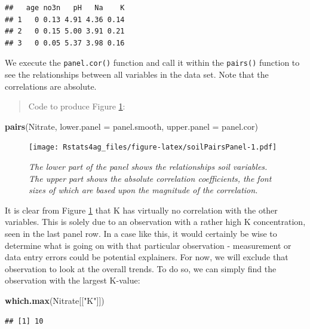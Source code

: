 \documentclass[letterpaper,]{book}
\newenvironment{Shaded}{\begin{snugshade}}{\end{snugshade}}
\newcommand{\DataTypeTok}[1]{\textcolor[rgb]{0.13,0.29,0.53}{#1}}
\newcommand{\KeywordTok}[1]{\textcolor[rgb]{0.13,0.29,0.53}{\textbf{#1}}}
\newcommand{\NormalTok}[1]{#1}
\newcommand{\StringTok}[1]{\textcolor[rgb]{0.31,0.60,0.02}{#1}}
\begin{document}
\begin{verbatim}
##   age no3n   pH   Na    K
## 1   0 0.13 4.91 4.36 0.14
## 2   0 0.15 5.00 3.91 0.21
## 3   0 0.05 5.37 3.98 0.16
\end{verbatim}

We execute the \texttt{panel.cor()} function and call it within the \texttt{pairs()} function to see the relationships between all variables in the data set. Note that the correlations are absolute.

\begin{quote}
Code to produce Figure \ref{fig:soilPairsPanel}:
\end{quote}

\begin{Shaded}
\begin{Highlighting}[]
\KeywordTok{pairs}\NormalTok{(Nitrate, }\DataTypeTok{lower.panel =}\NormalTok{ panel.smooth, }\DataTypeTok{upper.panel =}\NormalTok{ panel.cor)}
\end{Highlighting}
\end{Shaded}

\begin{figure}
\centering
\texttt{[image: Rstats4ag\_files/figure-latex/soilPairsPanel-1.pdf]}
\caption{\label{fig:soilPairsPanel}\emph{The lower part of the panel shows the relationships soil variables. The upper part shows the absolute correlation coefficients, the font sizes of which are based upon the magnitude of the correlation.}}
\end{figure}

It is clear from Figure \ref{fig:soilPairsPanel} that K has virtually no correlation with the other variables. This is solely due to an observation with a rather high K concentration, seen in the last panel row. In a case like this, it would certainly be wise to determine what is going on with that particular observation - measurement or data entry errors could be potential explainers. For now, we will exclude that observation to look at the overall trends. To do so, we can simply find the observation with the largest K-value:

\begin{Shaded}
\begin{Highlighting}[]
\KeywordTok{which.max}\NormalTok{(Nitrate[[}\StringTok{"K"}\NormalTok{]])}
\end{Highlighting}
\end{Shaded}

\begin{verbatim}
## [1] 10
\end{verbatim}
\end{document}
